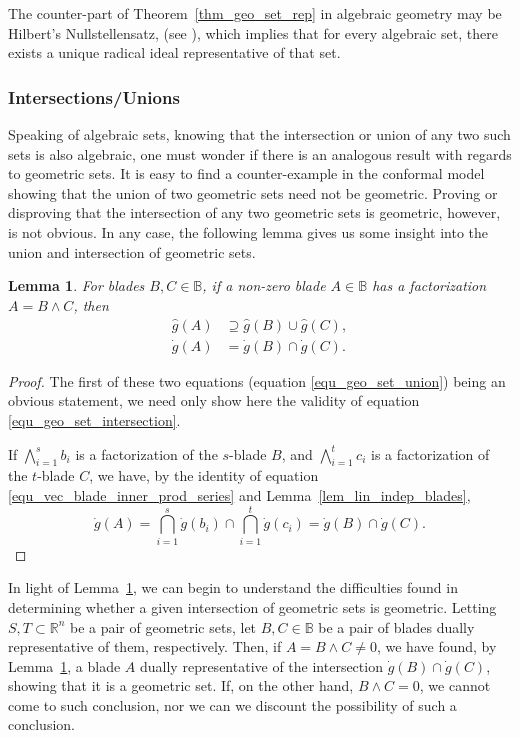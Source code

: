 \documentclass{birkjour}
\newtheorem{lem}[thm]{Lemma}
\theoremstyle{definition}
\theoremstyle{remark}
\numberwithin{equation}{section}
\newcommand{\R}{\mathbb{R}}
\newcommand{\B}{\mathbb{B}}
\newcommand{\gd}{\dot{g}}
\newcommand{\gh}{\hat{g}}
\begin{document}
The counter-part of Theorem~\ref{thm_geo_set_rep} in algebraic geometry may be Hilbert's Nullstellensatz, (see \cite[p.~206]{Garrity13}),
which implies that for every algebraic set, there exists a unique radical ideal representative of that set.

\subsubsection{Intersections/Unions}

Speaking of algebraic sets, knowing that the intersection or union of any two such sets is also algebraic,
one must wonder if there is an analogous result with regards to geometric sets.  It is easy to find a counter-example
in the conformal model showing that the union of two geometric sets need not be geometric.
Proving or disproving that the intersection of any two geometric sets is geometric, however, is not obvious.
In any case, the following lemma gives us some insight into the union and intersection of geometric sets.

\begin{lem}\label{lem_union_intersect}
For blades $B,C\in\B$, if a non-zero blade $A\in\B$ has a factorization $A=B\wedge C$, then
\begin{align}
\gh(A) &\supseteq \gh(B)\cup\gh(C),\label{equ_geo_set_union} \\
\gd(A) &= \gd(B)\cap\gd(C).\label{equ_geo_set_intersection}
\end{align}
\end{lem}
\begin{proof}
The first of these two equations (equation \eqref{equ_geo_set_union}) being an obvious statement,
we need only show here the validity of equation \eqref{equ_geo_set_intersection}.

If $\bigwedge_{i=1}^s b_i$ is a factorization of the $s$-blade $B$, and
$\bigwedge_{i=1}^t c_i$ is a factorization of the $t$-blade $C$, we have,
by the identity of equation \eqref{equ_vec_blade_inner_prod_series} and Lemma~\ref{lem_lin_indep_blades},
\begin{equation}
\gd(A) = \bigcap_{i=1}^s\gd(b_i)\cap\bigcap_{i=1}^t\gd(c_i) = \gd(B)\cap\gd(C).
\end{equation}
\end{proof}

In light of Lemma~\ref{lem_union_intersect}, we can begin to understand the difficulties found in determining
whether a given intersection of geometric sets is geometric.  Letting $S,T\subset\R^n$ be
a pair of geometric sets, let $B,C\in\B$ be a pair of blades dually representative of them, respectively.
Then, if $A=B\wedge C\neq 0$, we have found, by Lemma~\ref{lem_union_intersect}, a blade $A$ dually
representative of the intersection $\gd(B)\cap\gd(C)$, showing that it is a geometric set.
If, on the other hand, $B\wedge C=0$, we cannot come to such conclusion, nor we can we
discount the possibility of such a conclusion.
\end{document}
